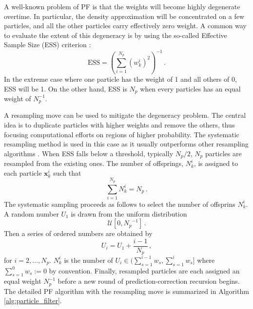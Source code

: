 A well-known problem of PF is that the weights will become highly degenerate overtime. In particular, the density approximation will be concentrated on a few particles, and all the other particles carry effectively zero weight. A common way to evaluate the extent of this degeneracy is by using the so-called Effective Sample Size (ESS) criterion \cite{liu2008monte}:
\begin{equation}
\text{ESS}=\left(\sum_{i=1}^{N_{p}}\left(w_k^{i}\right)^{2}\right)^{-1} \,.
\end{equation}
In the extreme case where one particle has the weight of 1 and all others of 0, ESS will be 1. On the other hand, ESS is $N_p$ when every particles has an equal weight of $N_p^{-1}$.

A resampling move can be used to mitigate the degeneracy problem. The central idea is to duplicate particles with higher weights and remove the others, thus focusing computational efforts on regions of higher probability. The systematic resampling method is used in this case as it usually outperforms other resampling algorithms \cite{doucet2009tutorial}. When ESS falls below a threshold, typically $N_p/2$, $N_p$ particles are resampled from the existing ones. The number of offsprings, $N_k^{i}$, is assigned to each particle $\boldsymbol{x}_k^i$ such that 
$$
\sum_{i=1}^{N_p}N_k^{i} = N_p \,.
$$
The systematic sampling proceeds as follows to select the number of offsprins $N_k^{i}$. A random number $U_{1}$ is drawn from the uniform distribution 
$$
\mathcal{U}\left[0, {N_p}^{-1}\right] \,.
$$
Then a series of ordered numbers are obtained by 
$$
U_{i}=U_{1}+\frac{i-1}{N_p} \,,
$$
for $i=2, \ldots, N_p$. $N_k^{i}$ is the number of $U_{i} \in(\sum_{s=1}^{i-1} w_{s}, \sum_{s=1}^{i} w_{s}]$ where $\sum_{s=1}^{0} w_{s} := 0$ by convention. Finally, resampled particles are each assigned an equal weight $N_{p}^{-1}$ before a new round of prediction-correction recursion begins. The detailed PF algorithm with the resampling move is summarized in Algorithm \ref{alg:particle_filter}.
